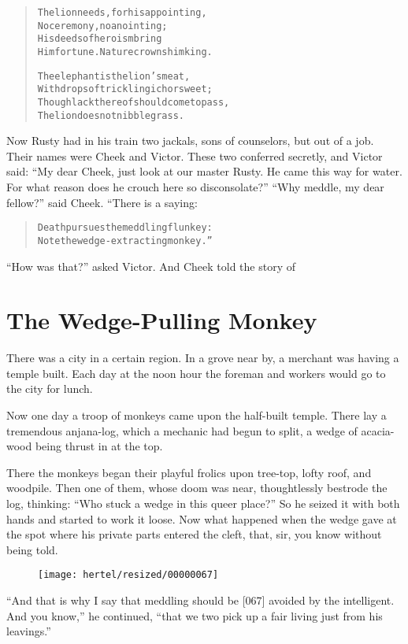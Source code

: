 \documentclass[article, twoside, 10pt]{memoir}
\renewenvironment{verbatim}{%
\begin{quote}%
\vskip -10pt%
\begin{alltt}\normalfont\small}{\end{alltt}%
\end{quote}%
\vskip -10pt
} %
\begin{document}
\begin{verbatim}
The lion needs, for his appointing,
No ceremony, no anointing;
His deeds of heroism bring
Him fortune. Nature crowns him king.

The elephant is the lion's meat,
With drops of trickling ichor sweet;
Though lack thereof should come to pass,
The lion does not nibble grass.
\end{verbatim}
Now Rusty had in his train two jackals, sons of counselors, but out
of a job. Their names were Cheek and Victor. These two conferred
secretly, and Victor said:
``My dear Cheek, just look at our master Rusty. He came this way for water. For what reason does he crouch here so disconsolate?''
``Why meddle, my dear fellow?'' said Cheek. “There is a saying:

\begin{verbatim}
Death pursues the meddling flunkey:
Note the wedge-extracting monkey.”
\end{verbatim}
``How was that?'' asked Victor. And Cheek told the story of

\chapter{The Wedge-Pulling Monkey}

There was a city in a certain region. In a grove near by, a
merchant was having a temple built. Each day at the noon hour the
foreman and workers would go to the city for lunch.

Now one day a troop of monkeys came upon the half-built temple.
There lay a tremendous anjana-log, which a mechanic had begun to
split, a wedge of acacia-wood being thrust in at the top.

There the monkeys began their playful frolics upon tree-top, lofty
roof, and woodpile. Then one of them, whose doom was near,
thoughtlessly bestrode the log, thinking:
``Who stuck a wedge in this queer place?'' So he seized it with
both hands and started to work it loose. Now what happened when the
wedge gave at the spot where his private parts entered the cleft,
that, sir, you know without being told.

\begin{figure}[p]\texttt{[image: hertel/resized/00000067]}\end{figure}``And that is why I say that meddling should be [067] avoided by the intelligent. And you know,''
he continued,
``that we two pick up a fair living just from his leavings.''
\end{document}
